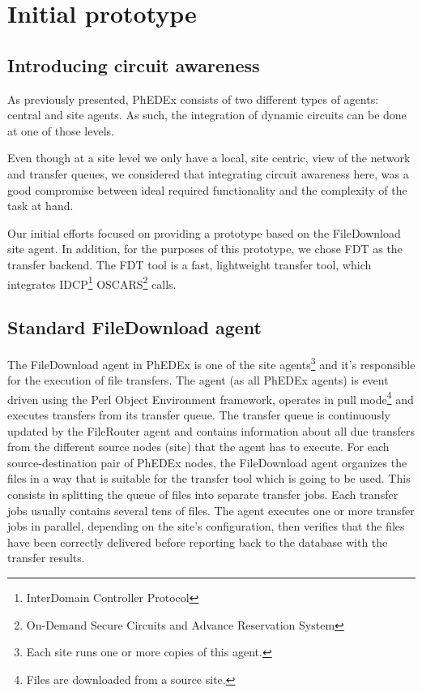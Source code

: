 \section{Initial prototype}

\subsection{Introducing circuit awareness}

As previously presented, PhEDEx consists of two different types of agents: 
central and site agents. As such, the integration of dynamic circuits can 
be done at one of those levels.

Even though at a site level we only have a local, site centric, view of
the network and transfer queues, we considered that integrating 
circuit awareness here, was a good compromise between ideal required 
functionality and the complexity of the task at hand.

Our initial efforts focused on providing a prototype based on the FileDownload
site agent. In addition, for the purposes of this prototype, we chose FDT
as the transfer backend. The FDT tool is a fast, lightweight transfer tool,
which integrates IDCP\footnote{InterDomain Controller Protocol} 
OSCARS\footnote{On-Demand Secure Circuits and Advance Reservation System} calls.

\subsection{Standard FileDownload agent}

The FileDownload agent in PhEDEx is one of the site agents\footnote{
Each site runs one or more copies of this agent.} and it's responsible for the
execution of file transfers. The agent (as all PhEDEx agents) is event driven 
using the Perl Object Environment framework, operates in pull mode\footnote{Files are
downloaded from a source site.} and executes transfers from its transfer queue.
The transfer queue is continuously updated by the FileRouter agent and contains 
information about all due transfers from the different source nodes (site) that the agent 
has to execute. For each source-destination pair of PhEDEx nodes, the FileDownload 
agent organizes the files in a way that is suitable for the transfer tool which is 
going to be used. This consists in splitting the queue of files into separate 
transfer jobs. Each transfer jobs usually contains several tens of files.
The agent executes one or more transfer jobs in parallel, depending 
on the site's configuration, then verifies that the files have been correctly 
delivered before reporting back to the database with the transfer results.

